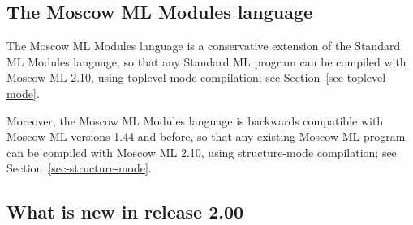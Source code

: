 \documentclass[fleqn,a4paper]{article}
\begin{document}
\subsection{The Moscow ML Modules language}

The Moscow ML Modules language is a conservative extension of the
Standard ML Modules language, so that any Standard ML program can be
compiled with Moscow ML 2.10, using toplevel-mode compilation; see
Section~\ref{sec-toplevel-mode}.

Moreover, the Moscow ML Modules language is backwards compatible with
Moscow ML versions 1.44 and before, so that any existing Moscow ML
program can be compiled with Moscow ML 2.10, using structure-mode
compilation; see Section~\ref{sec-structure-mode}.


\subsection{What is new in release 2.00}
\end{document}
